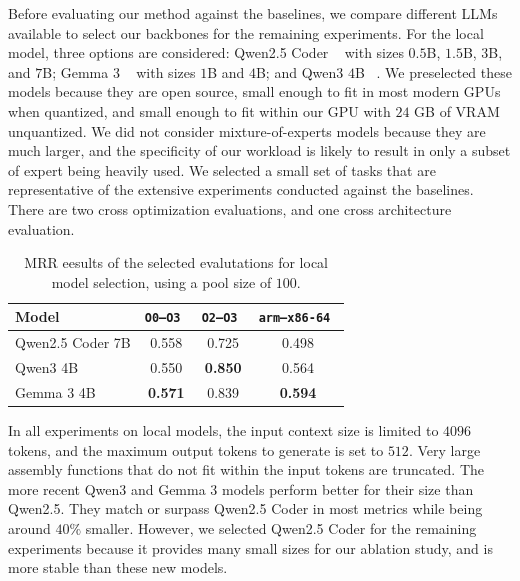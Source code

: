 Before evaluating our method against the baselines, we compare different LLMs available to select our backbones for the remaining experiments.
For the local model, three options are considered: Qwen2.5 Coder ~\cite{qwen2} with sizes \(0.5\)B, \(1.5\)B, \(3\)B, and \(7\)B;
Gemma 3 ~\cite{gemma3} with sizes \(1\)B and \(4\)B; and  Qwen3 \(4\)B ~\cite{qwen3}. We preselected these models because they are open source,
small enough to fit in most modern GPUs when quantized, and small enough to fit within our GPU with \(24\) GB of VRAM unquantized. We did not
consider mixture-of-experts models because they are much larger, and the specificity of our
workload is likely to result in only a subset of expert being heavily used. We selected a small set of tasks that are representative
of the extensive experiments conducted against the baselines. There are two cross optimization evaluations, and one cross architecture 
evaluation.
{
    \renewcommand{\arraystretch}{1.1}
    \begin{table}
    \centering
    \begin{tabular}{|l|ccc|} \hline
    Model            & \tt O0--O3 & \tt O2--O3 & \tt arm--x86-64 \\ \hline
    Qwen2.5 Coder 7B & 0.558      & 0.725      & 0.498            \\
    Qwen3 4B         & 0.550      & \bf 0.850  & 0.564            \\
    Gemma 3 4B       & \bf 0.571  & 0.839      & \bf 0.594        \\ \hline
    \end{tabular}
    \caption{MRR eesults of the selected evalutations for local model selection, using a pool size of \(100\).}
    \end{table}
}

In all experiments on local models, the input context size is limited to \(4096\) tokens, and the maximum output tokens to generate is set to \(512\).
Very large assembly functions that do not fit within the input tokens are truncated. The more recent Qwen3 and Gemma 3
models perform better for their size than Qwen2.5. They match or surpass Qwen2.5 Coder in most metrics while being around \(40\%\)
smaller. However, we selected Qwen2.5 Coder for the remaining experiments because it provides many small sizes for our ablation study,
and is more stable than these new models.

